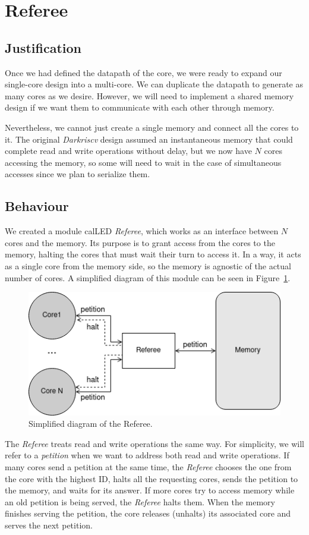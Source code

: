 \section{Referee}

\subsection{Justification} \label{referee-justification}
Once we had defined the datapath of the core, we were ready to expand our single-core design into a multi-core.
We can duplicate the datapath to generate as many cores as we desire. However, we will need to implement a shared memory design if we want them to communicate with each other through memory. 

Nevertheless, we cannot just create a single memory and connect all the cores to it. 
The original \textit{Darkriscv} design assumed an instantaneous memory that could complete read and write operations without delay, but we now have $N$ cores accessing the memory, so some will need to wait in the case of simultaneous accesses since we plan to serialize them.


\subsection{Behaviour} \label{referee-behaviour}
We created a module calLED \textit{Referee}, which works as an interface between $N$ cores and the memory.
Its purpose is to grant access from the cores to the memory, halting the cores that must wait their turn to access it.
In a way, it acts as a single core from the memory side, so the memory is agnostic of the actual number of cores.
A simplified diagram of this module can be seen in Figure~\ref{referee-fig}.

\begin{figure}[h!]
    \centering
    \includegraphics[width=.5\textwidth]{images/Referee_fig.png}
    \caption{Simplified diagram of the Referee.}
    \label{referee-fig}
\end{figure}

The \textit{Referee} treats read and write operations the same way.
For simplicity, we will refer to a \textit{petition} when we want to address both read and write operations.
If many cores send a petition at the same time, the \textit{Referee} chooses the one from the core with the highest ID, halts all the requesting cores, sends the petition to the memory, and waits for its answer.
If more cores try to access memory while an old petition is being served, the \textit{Referee} halts them.
When the memory finishes serving the petition, the core releases (unhalts) its associated core and serves the next petition.

